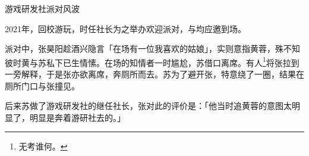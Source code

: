 \begin{section}{游戏研发社派对风波}
	\label{story:游戏研发社派对风波}

	2021年，回校游玩，时任社长为之举办欢迎派对，与均应邀到场。

	派对中，张昊阳趁酒兴隐言「在场有一位我喜欢的姑娘」，实则意指黄蓉，殊不知彼时黄与苏私下已生情愫。在场的知情者一时尴尬，苏借口离席。有人\footnote{无考谁何。}将张拉到一旁解释，于是张亦欲离席，奔厕所而去。苏为了避开张，特意绕了一圈，结果在厕所门口与张撞见。

	后来苏做了游戏研发社的继任社长，张对此的评价是：「他当时追黄蓉的意图太明显了，明显是奔着游研社去的。」
\end{section}